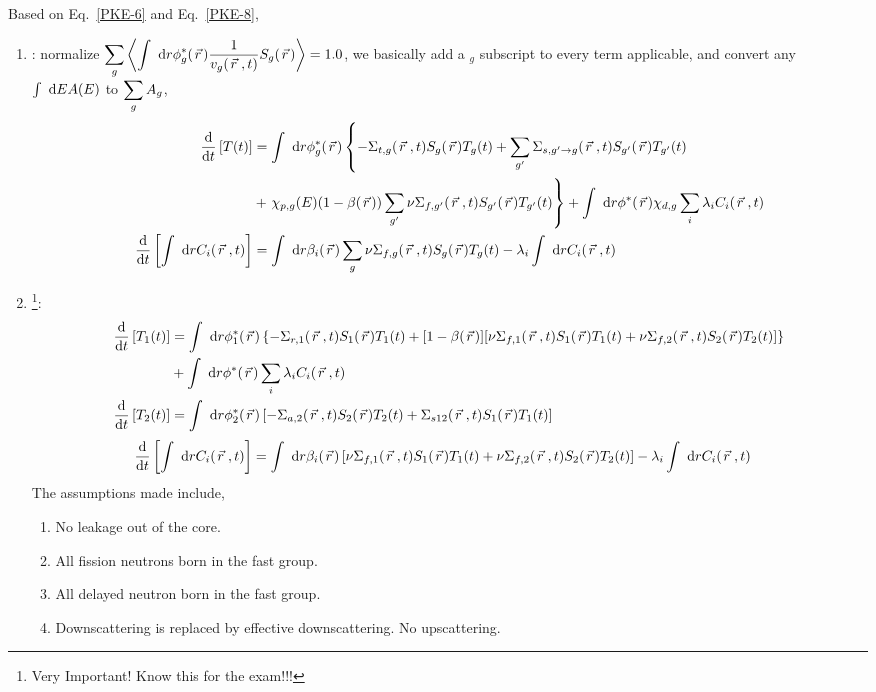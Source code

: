 \documentclass{school-22.211-notes}
\begin{document}
Based on Eq.~\ref{PKE-6} and Eq.~\ref{PKE-8}, 
\begin{enumerate}
\item {}: normalize $\displaystyle\sum_g \left<  \int \mbox{ }\mathrm{d} r \phi_g^* (\left.\vec{r}\right.) \frac{1}{v_g(\left.\vec{r}\right., t)} S_g (\left.\vec{r}\right.)  \right> = 1.0$, we basically add a $_g$ subscript to every term applicable, and convert any $\int \mbox{ }\mathrm{d} E A(E)$ to $\displaystyle\sum_{g} A_{g}$, 
  \begin{align}
 \frac{\mathrm{d}}{\mathrm{d}t} \left[ T(t) \right] &=  
    \int \mbox{ }\mathrm{d} r  \phi_g^* (\left.\vec{r}\right.)  \left\{  - \Sigma_{t,g} (\left.\vec{r}\right., t) S_g(\left.\vec{r}\right.) T_g(t)   + \displaystyle\sum_{g'} \Sigma_{s, g' \to g} (\left.\vec{r}\right., t) S_{g'}(\left.\vec{r}\right.) T_{g'} (t)  \right.  \notag \\
    &+  \left. \chi_{p,g} (E) (1-\beta (\left.\vec{r}\right.)) \displaystyle\sum_{g'} \nu \Sigma_{f,g'} (\left.\vec{r}\right., t) S_{g'} (\left.\vec{r}\right.) T_{g'}(t) \right\}  + \int \mbox{ }\mathrm{d} r \phi^*(\left.\vec{r}\right.) \chi_{d,g}  \displaystyle\sum_i \lambda_i C_i (\left.\vec{r}\right., t)    \label{PKE-9}  \\
     \frac{\mathrm{d}}{\mathrm{d}t} \left[ \int \mbox{ }\mathrm{d} r C_i (\left.\vec{r}\right., t) \right] &=   \int \mbox{ }\mathrm{d} r \beta_i (\left.\vec{r}\right.) \displaystyle\sum_g \nu \Sigma_{f,g} (\left.\vec{r}\right., t) S_g (\left.\vec{r}\right.) T_g(t)   - \lambda_i \int \mbox{ }\mathrm{d} r C_i (\left.\vec{r}\right., t)  \label{PKE-10}
  \end{align}


\item {}\footnote{Very Important! Know this for the exam!!!}:
  \begin{align}
  \frac{\mathrm{d}}{\mathrm{d}t} \left[ T_1(t) \right] &=   \int \mbox{ }\mathrm{d} r  \phi_1^* (\left.\vec{r}\right.)  \left\{  - \Sigma_{r,1} (\left.\vec{r}\right.,t) S_1(\left.\vec{r}\right.) T_1(t)  + [1-\beta (\left.\vec{r}\right.)][\nu \Sigma_{f,1} (\left.\vec{r}\right., t) S_{1} (\left.\vec{r}\right.) T_{1}(t) + \nu \Sigma_{f,2} (\left.\vec{r}\right., t) S_2 (\left.\vec{r}\right.) T_2 (t)] \right\} \notag \\
    &+ \int \mbox{ }\mathrm{d} r \phi^*(\left.\vec{r}\right.)   \displaystyle\sum_i \lambda_i C_i (\left.\vec{r}\right., t)     \label{PKE-11} \\
   \frac{\mathrm{d}}{\mathrm{d}t} \left[ T_2(t) \right] &=  
    \int \mbox{ }\mathrm{d} r  \phi_2^* (\left.\vec{r}\right.)  \left[ - \Sigma_{a,2} (\left.\vec{r}\right.,t) S_2(\left.\vec{r}\right.) T_2(t) + \Sigma_{s12} (\left.\vec{r}\right., t) S_1 (\left.\vec{r}\right.) T_1 (t)  \right]   \label{PKE-12}
  \end{align}
  \begin{align}
   \frac{\mathrm{d}}{\mathrm{d}t} \left[ \int \mbox{ }\mathrm{d} r C_i (\left.\vec{r}\right., t) \right] &=   \int \mbox{ }\mathrm{d} r \beta_i (\left.\vec{r}\right.) \left[ \nu \Sigma_{f,1} (\left.\vec{r}\right., t) S_1 (\left.\vec{r}\right.) T_1(t) + \nu \Sigma_{f,2} (\left.\vec{r}\right., t) S_2 (\left.\vec{r}\right.) T_2 (t) \right]   - \lambda_i \int \mbox{ }\mathrm{d} r C_i (\left.\vec{r}\right., t)  \label{PKE-13}
  \end{align}
  The assumptions made include, 
  \begin{enumerate}
    \item No leakage out of the core. 
    \item All fission neutrons born in the fast group. 
    \item All delayed neutron born in the fast group. 
    \item Downscattering is replaced by effective downscattering. No upscattering. 
  \end{enumerate}


\end{enumerate}
\end{document}
